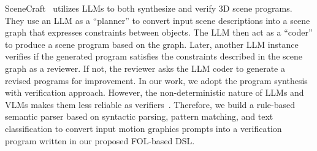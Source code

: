 SceneCraft~\cite{hu2025scenecraft} utilizes LLMs to both synthesize and verify 3D scene programs.
They use an LLM as a ``planner'' to convert input scene descriptions into a scene graph that expresses constraints between objects.
The LLM then act as a ``coder'' to produce a scene program based on the graph.
Later, another LLM instance verifies if the generated program satisfies the constraints described in the scene graph as a reviewer.
If not, the reviewer asks the LLM coder to generate a revised programs for improvement.
%
In our work, we adopt the program synthesis with verification
approach. 
However, the non-deterministic nature of LLMs and VLMs makes them less reliable as verifiers~\cite{brown2024large}.
Therefore, we build a rule-based semantic parser based on syntactic parsing, pattern matching, and text classification to convert input motion graphics prompts into a verification program written in our proposed FOL-based DSL.




